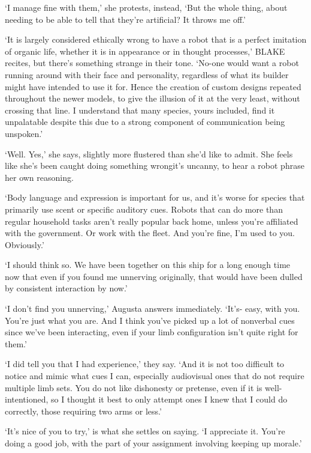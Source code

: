 `I manage fine with them,' she protests, instead, `But the
whole \textellipsis thing, about needing to be able to tell that
they're artificial? It throws me off.'

`It is largely considered ethically wrong to have a robot that is a
perfect imitation of organic life, whether it is in appearance or in
thought processes,' BLAKE recites, but there's something strange in
their tone. `No-one would want a robot running around with their face
and personality, regardless of what its builder might have intended to
use it for. Hence the creation of custom designs repeated throughout
the newer models, to give the illusion of it at the very least,
without crossing that line. I understand that many species, yours
included, find it unpalatable despite this due to a strong component
of communication being unspoken.'

`Well. Yes,' she says, slightly more flustered than she'd like to
admit. She feels like she's been caught doing something
wrong\textemdash it's uncanny, to hear a robot phrase her own
reasoning.

`Body language and expression is important for us, and it's worse for
species that primarily use scent or specific auditory cues. Robots
that can do more than regular household tasks aren't really popular
back home, unless you're affiliated with the government. Or work with
the fleet. And you're fine, I'm used to you. Obviously.'

`I should think so. We have been together on this ship for a long
enough time now that even if you found me unnerving originally, that
would have been dulled by consistent interaction by now.'

`I don't find you unnerving,' Augusta answers immediately. `It's-
easy, with you. You're just \textellipsis what you are. And I think
you've picked up a lot of nonverbal cues since we've been interacting,
even if your limb configuration isn't quite right for them.'

`I did tell you that I had experience,' they say. `And it is not too
difficult to notice and mimic what cues I can, especially audiovisual
ones that do not require multiple limb sets. You do not like
dishonesty or pretense, even if it is well-intentioned, so I thought
it best to only attempt ones I knew that I could do correctly, those
requiring two arms or less.'

`It's \textellipsis nice of you to try,' is what she settles on
saying. `I appreciate it. You're doing a good job, with the part of
your assignment involving keeping up morale.'

